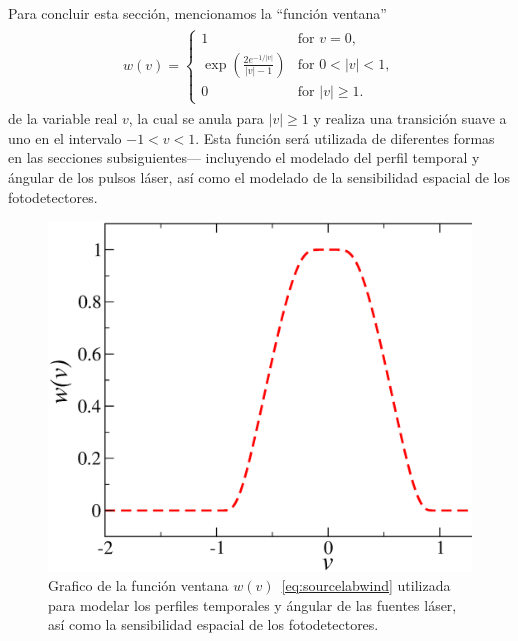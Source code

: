 Para concluir esta sección, mencionamos la ``función ventana''~\cite{Bruno2014}
\begin{equation}
\begin{aligned}
\begin{split}
w(v)=
\begin{cases}
  1 &\text{for} \, \, v = 0, \\
       \exp{\left(\frac{2e^{-1/|v|}}{|v|-1}\right)} & \text{for} \, \, 0 < |v| < 1, \\
       0 &\text{for} \, \, |v| \geq 1.
     \end{cases}
\end{split}
\end{aligned}
\label{eq:sourcelabwind}
\end{equation}
de la variable real $v$, la cual se anula para $|v|\geq 1$ y realiza 
una transición suave a uno en el intervalo $-1 < v < 1$. Esta función 
será utilizada de diferentes formas en las secciones subsiguientes---
incluyendo el modelado del perfil temporal y ángular de los pulsos láser, 
así como el modelado de la sensibilidad espacial de los fotodetectores.
\begin{figure}[h!]
\centering
  \includegraphics[width=0.5\linewidth]{figuras/windowed.eps}
  \caption{Grafico de la función ventana $w(v)$~\eqref{eq:sourcelabwind} utilizada 
  para modelar los perfiles temporales y ángular de las fuentes láser, 
  así como la sensibilidad espacial de los fotodetectores.}
 \label{fig:parallelgeom}
\end{figure}


